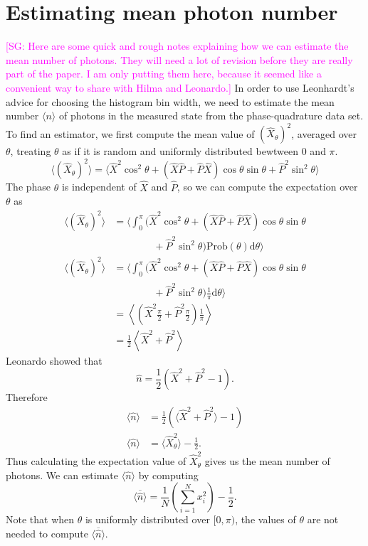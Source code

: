 \documentclass[
reprint,
superscriptaddress,
showpacs,
amsmath,
amssymb,
aps,
pra,
longbibliography
]{revtex4-1}
\providecommand{\aucmnt}[1]{#1}
\providecommand{\aucmnt}[1]{}
\newcommand{\SGc}[1]{\aucmnt{\textcolor{magenta}{[SG: #1]}}}
\begin{document}
\section{Estimating mean photon number}
\SGc{Here are some quick and rough notes explaining how we can
  estimate the mean number of photons.  They will need a lot of
  revision before they are really part of the paper.  I am only
  putting them here, because it seemed like a convenient way to share
  with Hilma and Leonardo.}  In order to use Leonhardt's advice for
choosing the histogram bin width, we need to estimate the mean number
$\langle n \rangle$ of photons in the measured state from the
phase-quadrature data set.  To find an estimator, we first compute the
mean value of $(\hat{X}_{\theta})^{2}$, averaged over $\theta$, treating
$\theta$ as if it is random and uniformly distributed bewtween $0$ and
$\pi$.
\begin{equation}
\langle (\hat{X}_{\theta})^{2} \rangle = \langle \hat{X}^{2}\cos^{2}\theta + (\hat{X}\hat{P}+\hat{P}\hat{X})\cos\theta\sin\theta + \hat{P}^{2}\sin^{2}\theta \rangle
\end{equation}
The phase $\theta$ is independent of $\hat{X}$ and $\hat{P}$, so we can compute the expectation over $\theta$ as
\begin{align}
\langle (\hat{X}_{\theta})^{2} \rangle &= \Big\langle \int_{0}^{\pi} (\hat{X}^{2}\cos^{2}\theta + (\hat{X}\hat{P}+\hat{P}\hat{X})\cos\theta\sin\theta \nonumber \\
 & \qquad \qquad + \hat{P}^{2}\sin^{2}\theta) \mathrm{Prob}(\theta) \mathrm{d}\theta \Big\rangle \\
\langle (\hat{X}_{\theta})^{2} \rangle &= \Big\langle \int_{0}^{\pi} (\hat{X}^{2}\cos^{2}\theta + (\hat{X}\hat{P}+\hat{P}\hat{X})\cos\theta\sin\theta \nonumber \\
 & \qquad \qquad + \hat{P}^{2}\sin^{2}\theta) \frac{1}{\pi} \mathrm{d}\theta \Big\rangle \\
 &= \left\langle (\hat{X}^{2}\frac{\pi}{2} + \hat{P}^{2}\frac{\pi}{2})\frac{1}{\pi} \right\rangle \\
 &= \frac{1}{2}\left\langle \hat{X}^{2} + \hat{P}^{2} \right\rangle
\end{align}
Leonardo showed that
\begin{equation}
\hat{n} = \frac{1}{2}\left(\hat{X}^{2}+\hat{P}^{2}-1\right).
\end{equation}
Therefore
\begin{align}
\langle\hat{n}\rangle &= \frac{1}{2}\left(\langle\hat{X}^{2}+\hat{P}^{2}\rangle-1\right) \\
\langle\hat{n}\rangle &= \langle \hat{X}_{\theta}^{2}\rangle-\frac{1}{2}.
\end{align}
Thus calculating the expectation value of $\hat{X}_{\theta}^{2}$ gives us the mean number of photons.  We can estimate $\langle \hat{n} \rangle$ by computing
\begin{equation}
\overline{\langle \hat{n} \rangle} = \frac{1}{N} \left(\sum_{i=1}^{N}x_{i}^{2}\right) - \frac{1}{2}.
\end{equation}
Note that when $\theta$ is uniformly distributed over $[0,\pi)$, the values of $\theta$ are not needed to compute $\overline{\langle \hat{n} \rangle}$.
\end{document}
